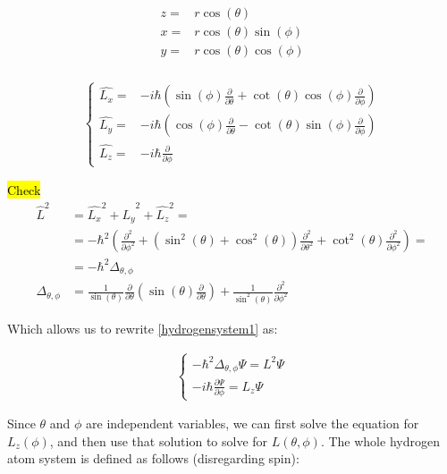 	\begin{align}
		z =& r \cos(\theta) \\ 
		x =& r \cos(\theta)\sin(\phi) \\ 
		y =& r \cos(\theta)\cos(\phi) \\ 								
	\end{align}
	
	\begin{align}
		\left\{ \begin{aligned}
			\hat{L_x} =& - i\hbar \left(\sin(\phi)\frac{\partial}{\partial \theta} + \cot(\theta)\cos(\phi)\frac{\partial}{\partial \phi}\right) \\
			\hat{L_y} =& - i\hbar \left(\cos(\phi)\frac{\partial}{\partial \theta} - \cot(\theta)\sin(\phi)\frac{\partial}{\partial \phi}\right) \\
			\hat{L_z} =& - i\hbar \frac{\partial}{\partial \phi}
		\end{aligned} \right.
	\end{align}
	
	\hl{Check}
	\begin{align}
		\hat{L}^2 	&= \hat{L_x}^2 + \hat{L_y}^2 + \hat{L_z}^2 = \\
		&= -\hbar^2 \left( \frac{\partial^2}{\partial \phi^2} + \left(\sin^2(\theta) + \cos^2(\theta) \right)\frac{\partial^2}{\partial \theta^2} + \cot^2(\theta) \frac{\partial^2}{\partial \phi^2} \right) = \\
		&= -\hbar^2 \Delta_{\theta, \phi} \\
		\Delta_{\theta, \phi} &= \frac{1}{\sin (\theta)}\frac{\partial}{\partial \theta}\left(\sin(\theta)\frac{\partial}{\partial \theta}\right) + \frac{1}{\sin^2(\theta)}\frac{\partial^2}{\partial \phi ^2}
	\end{align}
	
	Which allows us to rewrite \ref{hydrogensystem1} as:
	
	\begin{align}
		\left\{ \begin{aligned}
			-\hbar^2 \Delta_{\theta, \phi} \Psi = L^2 \Psi \\
			-i\hbar \frac{\partial \Psi}{\partial \phi} = L_z \Psi
		\end{aligned} \right.				
	\end{align}
	
	Since $\theta$ and $\phi$ are independent variables, we can first solve the equation for $L_z(\phi)$, and then use that solution to solve for $L(\theta, \phi)$. The whole hydrogen atom system is defined as follows (disregarding spin):
	
